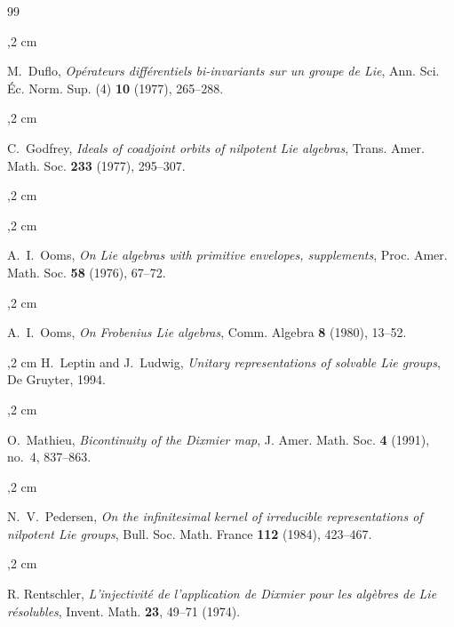 \documentclass[11pt]{amsart}
\theoremstyle{plain}
\theoremstyle{definition}
\theoremstyle{remark}
\begin{document}
\begin{thebibliography}{99}
		
		,2 cm
		
		
		
		 M.~Duflo, \emph{Op\'erateurs diff\'erentiels bi-invariants sur un groupe de Lie}, Ann. Sci. \'Ec. Norm. Sup. (4) \textbf{10} (1977), 265--288.
		
		,2 cm
		
		
		 C.~Godfrey, \emph{Ideals of coadjoint orbits of nilpotent Lie algebras}, Trans. Amer. Math. Soc. \textbf{233} (1977), 295--307.
		
		
		,2 cm
		
		
		
		,2 cm
		
		 A.~I.~Ooms, \emph{On Lie algebras with primitive envelopes, supplements}, Proc. Amer. Math. Soc. \textbf{58} (1976), 67--72.
		
		
		,2 cm
		
		
		 A.~I.~Ooms, \emph{On Frobenius Lie algebras}, Comm. Algebra \textbf{8} (1980), 13--52.
		
		,2 cm
		 H.~Leptin and J.~Ludwig, \emph{Unitary representations of solvable Lie groups}, De Gruyter, 1994.
		
		,2 cm
		
		
		 O.~Mathieu, \emph{Bicontinuity of the Dixmier map}, J. Amer. Math. Soc. \textbf{4} (1991), no.~4, 837--863.
		
		
		
		
		,2 cm
		
		
		 N.~V.~Pedersen, \emph{On the infinitesimal kernel of irreducible representations of nilpotent Lie groups}, Bull. Soc. Math. France \textbf{112} (1984), 423--467.
		
		,2 cm
		
		R. Rentschler, \textsl{L'injectivit\'e de l'application de Dixmier pour les alg\`ebres de Lie r\'esolubles}, Invent. Math. \textbf{23}, 49--71 (1974).
		
	\end{thebibliography}
	
\end{document}

